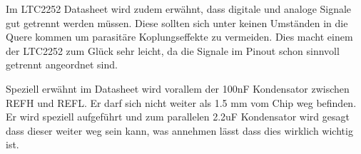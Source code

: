 Im LTC2252 Datasheet wird zudem erwähnt, dass digitale und analoge Signale gut getrennt werden müssen. Diese sollten sich unter keinen Umständen in die Quere kommen um parasitäre Koplungseffekte zu vermeiden. Dies macht einem der LTC2252 zum Glück sehr leicht, da die Signale im Pinout schon sinnvoll getrennt angeordnet sind.

Speziell erwähnt im Datasheet wird vorallem der 100nF Kondensator zwischen REFH und REFL. Er darf sich nicht weiter als 1.5 mm vom Chip weg befinden. Er wird speziell aufgeführt und zum parallelen 2.2uF Kondensator wird gesagt dass dieser weiter weg sein kann, was annehmen lässt dass dies wirklich wichtig ist.

